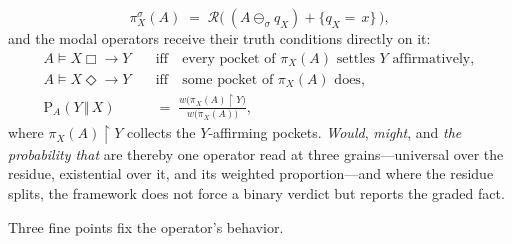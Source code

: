 \documentclass[11pt]{article}
\theoremstyle{definition}
\begin{document}
\begin{equation*}
\pi^{\sigma}_X(A) \;=\; \mathcal{R}\big(\ (A \ominus_{\sigma} q_X) + \{q_X {=}\, x\} \,\big),
\end{equation*}
and the modal operators receive their truth conditions directly on it:
\begin{align*}
A \models X \mathrel{\Box\!\!\rightarrow} Y \quad &\text{iff} \quad \text{every pocket of } \pi_X(A) \text{ settles } Y \text{ affirmatively}, \\
A \models X \mathrel{\Diamond\!\!\rightarrow} Y \quad &\text{iff} \quad \text{some pocket of } \pi_X(A) \text{ does}, \\
\mathrm{P}_A(Y \,\Vert\, X) \;&=\; \frac{w\big(\pi_X(A) \restriction Y\big)}{w\big(\pi_X(A)\big)},
\end{align*}
where $\pi_X(A) \restriction Y$ collects the $Y$-affirming pockets. \emph{Would}, \emph{might}, and \emph{the probability that} are thereby one operator read at three grains---universal over the residue, existential over it, and its weighted proportion---and where the residue splits, the framework does not force a binary verdict but reports the graded fact.

Three fine points fix the operator's behavior.
\end{document}
